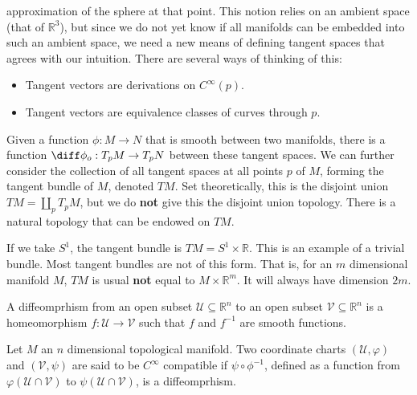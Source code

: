         approximation of the sphere at that point. This notion relies on an
        ambient space (that of $\mathbb{R}^{3}$), but since we do not yet know
        if all manifolds can be embedded into such an ambient space, we need a
        new means of defining tangent spaces that agrees with our intuition.
        There are several ways of thinking of this:
        \begin{itemize}
            \item Tangent vectors are derivations on $C^{\infty}(p)$.
            \item Tangent vectors are equivalence classes of curves through $p$.
        \end{itemize}
        Given a function $\phi:M\rightarrow{N}$ that is smooth between two
        manifolds, there is a function $\diff\phi_{o}:T_{p}M\rightarrow{T}_{p}N$
        between these tangent spaces. We can further consider the collection of
        all tangent spaces at all points $p$ of $M$, forming the tangent bundle
        of $M$, denoted $TM$. Set theoretically, this is the disjoint union
        $TM=\coprod_{p}T_{p}M$, but we do \textbf{not} give this the disjoint
        union topology. There is a natural topology that can be endowed on $TM$.
        \begin{example}
            If we take $S^{1}$, the tangent bundle is
            $TM=S^{1}\times\mathbb{R}$. This is an example of a trivial bundle.
            Most tangent bundles are not of this form. That is, for an $m$
            dimensional manifold $M$, $TM$ is usual \textbf{not} equal to
            $M\times\mathbb{R}^{m}$. It will always have dimension $2m$.
        \end{example}
        \begin{definition}
            A diffeomprhism from an open subset
            $\mathcal{U}\subseteq\mathbb{R}^{n}$ to an open subset
            $\mathcal{V}\subseteq\mathbb{R}^{n}$ is a homeomorphism
            $f:\mathcal{U}\rightarrow\mathcal{V}$ such that $f$ and
            $f^{\minus{1}}$ are smooth functions.
        \end{definition}
        \begin{definition}
            Let $M$ an $n$ dimensional topological manifold. Two coordinate
            charts $(\mathcal{U},\varphi)$ and $(\mathcal{V},\psi)$ are said to
            be $C^{\infty}$ compatible if $\psi\circ\phi^{\minus{1}}$,
            defined as a function from $\varphi(\mathcal{U}\cap\mathcal{V})$ to
            $\psi(\mathcal{U}\cap\mathcal{V})$, is a diffeomprhism.
        \end{definition}
